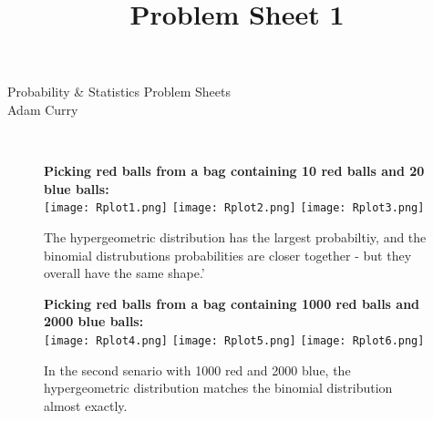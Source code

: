 \documentclass{article}
\title{Problem Sheet 1}
\begin{document}
Probability \& Statistics Problem Sheets\\
Adam Curry
\vspace{3 mm}
\hline
\hspace{25 mm}

\large{}\\

\begin{figure}[h]
\centering
\textbf{Picking red balls from a bag containing 10 red balls and 20 blue balls:}\\
\texttt{[image: Rplot1.png]}
\texttt{[image: Rplot2.png]}
\texttt{[image: Rplot3.png]}

The hypergeometric distribution has the largest probabiltiy, and the binomial distrubutions probabilities are closer together - but they overall have the same shape.'
\centering
\end{figure}

\begin{figure}[h]
\centering
\textbf{Picking red balls from a bag containing 1000 red balls and 2000 blue balls:}\\
\texttt{[image: Rplot4.png]}
\texttt{[image: Rplot5.png]}
\texttt{[image: Rplot6.png]}

In the second senario with 1000 red and 2000 blue, the hypergeometric distribution matches the binomial distribution almost exactly.
\centering
\end{figure}
\end{document}
